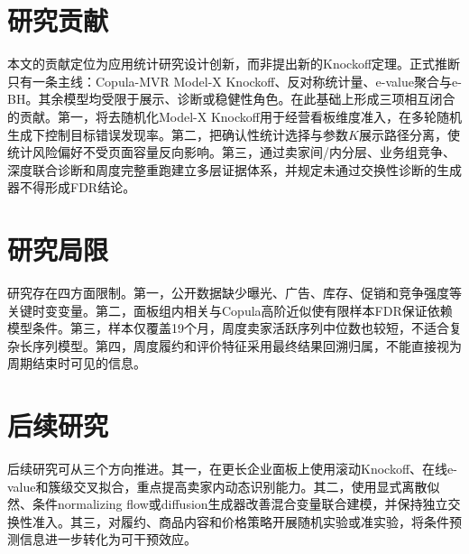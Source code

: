 \documentclass{sufethesismas}
\begin{document}
\section{研究贡献}

本文的贡献定位为应用统计研究设计创新，而非提出新的Knockoff定理。正式推断只有一条主线：Copula-MVR Model-X Knockoff、反对称统计量、e-value聚合与e-BH。其余模型均受限于展示、诊断或稳健性角色。在此基础上形成三项相互闭合的贡献。第一，将去随机化Model-X Knockoff用于经营看板维度准入，在多轮随机生成下控制目标错误发现率。第二，把确认性统计选择与参数\(K\)展示路径分离，使统计风险偏好不受页面容量反向影响。第三，通过卖家间/内分层、业务组竞争、深度联合诊断和周度完整重跑建立多层证据体系，并规定未通过交换性诊断的生成器不得形成FDR结论。

\section{研究局限}

研究存在四方面限制。第一，公开数据缺少曝光、广告、库存、促销和竞争强度等关键时变变量。第二，面板组内相关与Copula高阶近似使有限样本FDR保证依赖模型条件。第三，样本仅覆盖19个月，周度卖家活跃序列中位数也较短，不适合复杂长序列模型。第四，周度履约和评价特征采用最终结果回溯归属，不能直接视为周期结束时可见的信息。

\section{后续研究}

后续研究可从三个方向推进。其一，在更长企业面板上使用滚动Knockoff、在线e-value和簇级交叉拟合，重点提高卖家内动态识别能力。其二，使用显式离散似然、条件normalizing flow或diffusion生成器改善混合变量联合建模，并保持独立交换性准入。其三，对履约、商品内容和价格策略开展随机实验或准实验，将条件预测信息进一步转化为可干预效应。
\end{document}
